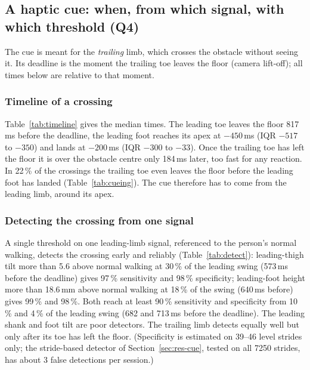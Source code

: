 \subsection{A haptic cue: when, from which signal, with which threshold (Q4)}
\label{sec:res-haptic}

The cue is meant for the \emph{trailing} limb, which crosses the obstacle without seeing it. Its deadline is the moment the trailing
toe leaves the floor (camera lift-off); all times below are relative to that moment.

\subsubsection{Timeline of a crossing}

Table~\ref{tab:timeline} gives the median times. The leading toe leaves the floor 817\,ms before the deadline, the leading foot
reaches its apex at $-450$\,ms (IQR $-517$ to $-350$) and lands at $-200$\,ms (IQR $-300$ to $-33$). Once the trailing toe has left
the floor it is over the obstacle centre only 184\,ms later, too fast for any reaction. In 22\,\% of the crossings the trailing toe
even leaves the floor before the leading foot has landed (Table~\ref{tab:cueing}). The cue therefore has to come from the leading
limb, around its apex.

\begin{table}[htbp]
\centering
\caption{Timeline of a crossing relative to the trailing toe lift-off (deadline of a cue for the trailing limb).}
\label{tab:timeline}

\end{table}

\begin{table}[htbp]
\centering
\caption{Cueing window: time from the leading-limb events to the trailing toe lift-off, overall and per height; \% $>$ 0 = share of
crossings in which the event comes before the lift-off.}
\label{tab:cueing}

\end{table}

\subsubsection{Detecting the crossing from one signal}

A single threshold on one leading-limb signal, referenced to the person's normal walking, detects the crossing early and reliably
(Table~\ref{tab:detect}): leading-thigh tilt more than 5.6\textdegree{} above normal walking at 30\,\% of the leading swing (573\,ms
before the deadline) gives 97\,\% sensitivity and 98\,\% specificity; leading-foot height more than 18.6\,mm above normal walking at
18\,\% of the swing (640\,ms before) gives 99\,\% and 98\,\%. Both reach at least 90\,\% sensitivity and specificity from 10\,\% and
4\,\% of the leading swing (682 and 713\,ms before the deadline). The leading shank and foot tilt are poor detectors. The trailing
limb detects equally well but only after its toe has left the floor. (Specificity is estimated on 39--46 level strides only; the
stride-based detector of Section~\ref{sec:res-cue}, tested on all 7250 strides, has about 3 false detections per session.)


